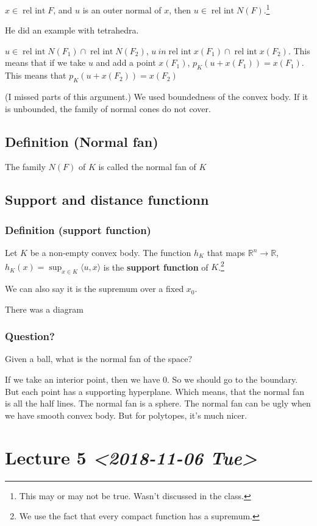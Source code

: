 \documentclass[11pt]{article}
\def\R{\mathbb{R}}
\def\relint{\operatorname{rel\ int}}
\begin{document}
\(x \in \relint F\), and \(u\) is an outer normal of \(x\), then \(u\in \relint
    N(F)\).\footnote{This may or may not be true. Wasn't discussed in the class.}

He did an example with tetrahedra.

\(u \in \relint N(F_1) \cap \relint N(F_2)\), \(u\ in \relint x(F_1) \cap
    \relint x(F_2)\). This means that if we take \(u\) and add a point \(x(F_1)\),
\(p_K(u + x(F_1)) = x(F_1)\). This means that \(p_K(u + x(F_2)) = x(F_2)\)

(I missed parts of this argument.) We used boundedness of the convex body.
If it is unbounded, the family of normal cones do not cover.
\subsection{Definition (Normal fan)}
\label{sec:orgb8f53a4}
The family \(N(F)\) of \(K\) is called the normal fan of \(K\)
\subsection{Support and distance functionn}
\label{sec:org58accb4}
\subsubsection{Definition (support function)}
\label{sec:orga57005a}
Let \(K\) be a non-empty convex body. The function \(h_K\) that maps \(\R^n
    \rightarrow \R\), \(h_K(x) = \sup_{x\in K} \langle u, x\rangle\) is the
\textbf{support function} of \(K\).\footnote{We use the fact that every compact function has a supremum.}

We can also say it is the supremum over a fixed \(x_0\).

There was a diagram
\subsubsection{Question?}
\label{sec:org859fd97}
Given a ball, what is the normal fan of the space?

If we take an interior point, then we have \(0\). So we should go to the
boundary. But each point has a supporting hyperplane. Which means, that the
normal fan is all the half lines. The normal fan is a sphere. The normal fan
can be ugly when we have smooth convex body. But for polytopes, it's much
nicer.
\section{Lecture 5 \textit{<2018-11-06 Tue>}}
\label{sec:org6c4b4d5}
\end{document}
